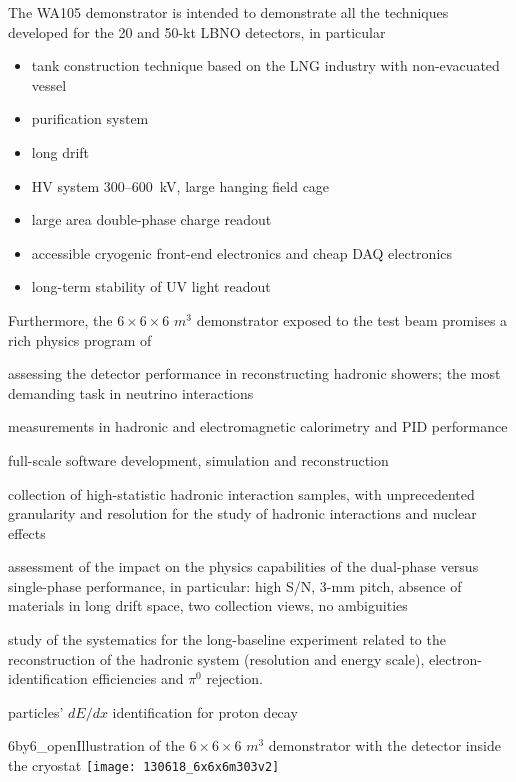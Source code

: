 {The WA105 demonstrator is intended to demonstrate all the techniques developed for the 20 and 50-kt LBNO detectors, in particular

\begin{itemize}
\item{tank construction technique based on the LNG industry with non-evacuated vessel}
\item{purification system}
\item{long drift}
\item{HV system 300--600~kV, large hanging field cage}
\item{large area double-phase charge readout}
\item{accessible cryogenic front-end electronics and cheap DAQ electronics}
\item{long-term stability of UV light readout}
\end{itemize}

Furthermore, the $6\times 6\times 6$ $m^3$ demonstrator exposed to the test beam promises a rich physics program of

\begin{itemize}
\item{assessing the detector performance in reconstructing hadronic showers; the most demanding task in neutrino interactions}
\item{measurements in hadronic and electromagnetic calorimetry and PID performance}
\item{full-scale software development, simulation and reconstruction}
\item{collection of high-statistic hadronic interaction samples, with unprecedented granularity and resolution for the study of hadronic interactions and nuclear effects}
\item{assessment of the impact on the physics capabilities of the dual-phase versus %
single-phase performance, in particular: high S/N, 3-mm pitch, absence of materials in long drift space, two collection views, no ambiguities}
\item{study of the systematics for the long-baseline experiment related to the reconstruction of the hadronic system (resolution and energy scale), electron-identification efficiencies and $\pi^0$ rejection. 
\item particles' $dE/dx$ identification for proton decay}
\end{itemize}


\begin{cdrfigure}{6by6_open}{Illustration of the  $6\times 6\times 6$ $m^3$  demonstrator with the %
detector inside the cryostat}
\texttt{[image: 130618\_6x6x6m303v2]}
\end{cdrfigure}

}
